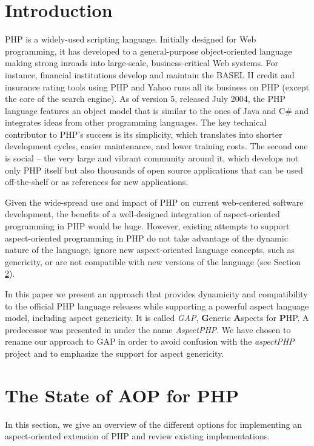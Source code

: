 \documentclass{acm_proc_article-sp}
\begin{document}
  

\section{Introduction}

PHP \cite{PHP} is a widely-used scripting language. Initially
designed for Web programming, it has developed to a
general-purpose object-oriented language making strong inroads
into large-scale, business-critical Web systems. For instance,
financial institutions develop and maintain the BASEL II
\cite{BASELII} credit and insurance rating tools using PHP and
Yahoo runs all its business on PHP (except the core of the search
engine). As of version 5, released July 2004, the PHP language
features an object model that is similar to the ones of Java and
C\# and integrates ideas from other programming languages. The key
technical contributor to PHP's success is its sim\-pli\-city,
which translates into shorter development cycles, easier
maintenance, and lower training costs. The second one is social --
the very large and vibrant community around it, which develops not
only PHP itself but also thousands of open source applications
that can be used off-the-shelf or as references for new
applications.

Given the wide-spread use and impact of PHP on current
web-centered software development, the benefits of a well-designed
integration of aspect-oriented programming in PHP would be huge.
However, existing attempts to support aspect-oriented programming
in PHP do not take advantage of the dynamic nature of the
language, ignore new aspect-oriented language concepts, such as
genericity, or are not compatible with new versions of the
language (see Section \ref{sec:stateOfArt}).

In this paper we present an approach that provides dynamicity and
compatibility to the official PHP language releases while
supporting a powerful aspect language model, including aspect
genericity. It is called \emph{GAP}, \textbf{G}eneric
\textbf{A}spects for \textbf{P}HP. A predecessor was presented in
\cite{sb06} under the name \emph{AspectPHP}. We have chosen to rename
our approach to GAP in order to avoid confusion with the
\emph{aspectPHP} project \cite{aspectPHP} and to emphasize the
support for aspect genericity.

\section{The State of AOP for PHP}\label{sec:stateOfArt}%
In this section, we give an overview of the different options for
implementing an aspect-oriented extension of PHP and review
existing implementations.
\end{document}
